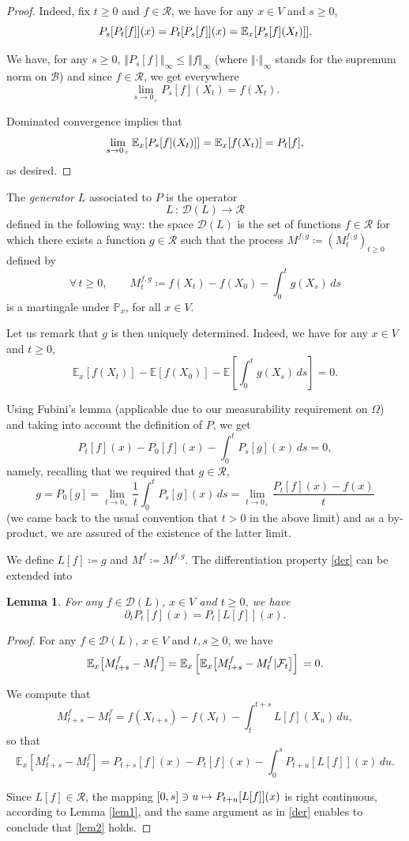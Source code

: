 \documentclass[JEP,XML,SOM,Unicode,NoFloatCountersInSection,published]{cedram}
\newcommand\mto{\mathchoice{\longmapsto}{\mapsto}{\mapsto}{\mapsto}}
\theoremstyle{plain}
\newtheorem{lemma}[thm]{Lemma}
\theoremstyle{definition}
\newcommand{\EE}{{\mathbb E}}
\newcommand{\PP}{{\mathbb P}}
\newcommand\df{\coloneqq}
\newcommand{\bq}{\begin{equation*}}
\newcommand{\bqn}[1]{\begin{equation}\label{#1}}
\newcommand{\eq}{\end{equation*}}
\newcommand{\eqn}{\end{equation}}
\newcommand{\fo}{\forall\,}
\newcommand{\lVe}{\lt\Vert}
\newcommand{\rVe}{\rt\Vert}
\newcommand{\lt}{\left}
\newcommand{\rt}{\right}
\newcommand{\st}{\,:\,}
\let\pa\partial
\let\iy\infty
\newcommand{\cB}{\mathcal{B}}
\newcommand{\cD}{\mathcal{D}}
\newcommand{\cF}{\mathcal{F}}
\newcommand{\cR}{\mathcal{R}}
\begin{document}
\begin{proof}
Indeed, fix $t\geq 0$ and $f\in\cR$, we have for any $x\in V$ and $s\geq 0$,
\bq
P_s[P_t[f]](x)=P_t[P_s[f]](x)\\
=\EE_x[ P_s[f](X_t)]].\eq
\par
We have, for any $s\geq 0$,
$\lVe P_s[f]\rVe_{\iy}\leq \lVe f\rVe_{\iy}$ (where $\lVe \cdot\rVe_{\iy}$ stands for the supremum norm on $\cB$)
and since $f\in\cR$, we get
everywhere
\bq
\lim_{s\to 0_+} P_s[f](X_t)=f(X_t).\eq
\par
Dominated convergence implies that
\bq
\lim_{s\to 0_+} \EE_x[ P_s[f](X_t)]]=\EE_x[f(X_t)]\\
=P_t[f],
\eq
as desired.\end{proof}

The \emph{generator} $L$ associated to $P$ is the operator
\bq
L\st \cD(L)\to \cR\eq
defined in the following way:
the space $\cD(L)$ is the set of functions $f\in\cR$
for which there exists a function $g\in\cR$ such that
the process $M^{f,g}\df(M^{f,g}_t)_{t\geq 0}$ defined by
\bq
\fo t\geq 0,\qquad M^{f,g}_t\df f(X_t)-f(X_0)-\int_0^t g(X_s)\, ds\eq
is a martingale under $\PP_x$, for all $x\in V$.
\par
Let us remark that $g$ is then uniquely determined. Indeed, we have for any $x\in V$ and $t\geq 0$,
\bq
\EE_x[f(X_t)]-\EE[f(X_0)]-\EE\lt[\int_0^t g(X_s)\, ds\rt]=0.\eq
\par
Using Fubini's lemma (applicable due to our measurability requirement on $\Omega$) and taking into account the definition of $P$, we get
\bq
P_t[f](x)-P_0[f](x)-\int_0^tP_s[g](x)\,ds=0,
\eq
namely, recalling that we required that $g\in\cR$,
\bqn{der}
g=P_0[g] =\lim_{t\to 0_+} \frac1t \int_0^tP_s[g](x)\,ds=\lim_{t\to 0_+} \frac{P_t[f](x)-f(x)}{t}\eqn
(we came back to the usual convention that $t>0$ in the above limit) and as a by-product, we are assured of the existence of the latter limit.
\par
We define $L[f]\df g$ and $M^f\df M^{f,g}$.
The differentiation property \eqref{der} can be extended into
\begin{lemma}
For any $f\in\cD(L)$, $x\in V$ and $t\geq 0$, we have
\bqn{lem2}
\pa_t P_t[f](x)=P_t[L[f]](x).
\eqn
\end{lemma}
\begin{proof}
For any $f\in\cD(L)$, $x\in V$ and $t,s\geq 0$, we have
\bq
\EE_x\bigl[ M_{t+s}^f-M_t^f\bigr]=\EE_x\lt[\EE_x\bigl[ M_{t+s}^f-M_t^f\vert\cF_t\bigl]\rt]\\
=0.\eq
\par
We compute that
\bq
M_{t+s}^f-M_t^f=f(X_{t+s})-f(X_t)-\int_t^{t+s} L[f](X_u)\, du,
\eq
so that
\bq
\EE_x\lt[ M_{t+s}^f-M_t^f\rt]=
P_{t+s}[f](x)-P_t[f](x)-\int_0^sP_{t+u}[L[f]](x)\, du.\eq\par
Since $L[f]\in\cR$, the mapping $[0,s]\ni u\mto P_{t+u}[L[f]](x)$ is right continuous, accord\-ing to Lemma \ref{lem1},
and the same argument as in \eqref{der} enables to conclude that \eqref{lem2} holds.\end{proof}
\end{document}
